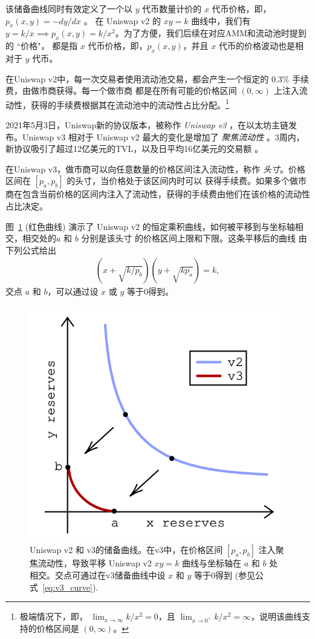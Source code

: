 \documentclass[sigconf, dvipsnames]{acmart}
\begin{document}
该储备曲线同时有效定义了一个以 $y$ 代币数量计价的 $x$ 代币价格，即，$p_x(x,y) = -dy/dx$ \cite{krishnamachari2021dynamic}。
在 Uniswap v2 的 $xy = k$ 曲线中，我们有 $y=k/x \implies p_x(x,y) = k/x^2$。为了方便，我们后续在对应AMM和流动池时提到的 ``价格"，
都是指 $x$ 代币价格，即，$p_x(x,y)$，并且 $x$ 代币的价格波动也是相对于 $y$ 代币。

%
在Uniswap v2中，每一次交易者使用流动池交易，都会产生一个恒定的 0.3\% \cite{adams2020uniswap}手续费，由做市商获得。每一个做市商
都是在所有可能的价格区间 $(0, \infty)$ 上注入流动性，获得的手续费根据其在流动池中的流动性占比分配。\footnote{极端情况下，即，
$\lim_{x\to \infty} k/x^2 = 0$，且  $\lim_{x\to 0^+} k/x^2 = \infty$，说明该曲线支持的价格区间是 $(0,\infty)$。}

2021年5月3日，Uniswap新的协议版本，被称作 {\em Uniswap v3} \cite{adams2021uniswap}，在以太坊主链发布。Uniswap v3 相对于 Uniswap v2
最大的变化是增加了 \textit{聚焦流动性} \cite{adams2021uniswap}。3周内，新协议吸引了超过12亿美元的TVL，以及日平均16亿美元的交易额 
\cite{univ3_analytics}。

%
在Uniswap v3，做市商可以向任意数量的价格区间注入流动性，称作 {\em 头寸}。价格区间在 $[p_a,p_b]$ 的头寸，当价格处于该区间内时可以
获得手续费。如果多个做市商在包含当前价格的区间内注入了流动性，获得的手续费由他们在该价格的流动性占比决定。

%
图~\ref{fig:v2v3} (红色曲线) 演示了 Uniswap v2 的恒定乘积曲线，如何被平移到与坐标轴相交，相交处的$a$ 和 $b$ 分别是该头寸
的价格区间上限和下限。这条平移后的曲线 \cite{adams2021uniswap} 由下列公式给出
\begin{align}\label{eq:v3_curve}
    \left(x + \sqrt{k / p_b} \right) \left(y +\sqrt{k p_a}\right) = k,
\end{align}
交点 $a$ 和 $b$，可以通过设 $x$ 或 $y$ 等于0得到。
%
\begin{figure}
    \centering
    \includegraphics[width=0.5\linewidth]{img/v2v3.png}
    \caption{Uniswap v2 和 v3的储备曲线。在v3中，在价格区间 $[p_a,p_b]$ 注入聚焦流动性，导致平移 Uniswap v2 $xy=k$ 曲线与坐标轴在 $a$ 和 $b$ 处相交。交点可通过在v3储备曲线中设 $x$ 和 $y$ 等于0得到 (参见公式~\ref{eq:v3_curve}).
    \label{fig:v2v3}}
\end{figure}
\end{document}
